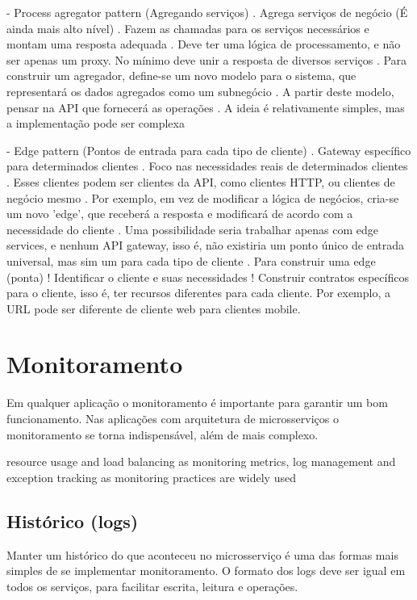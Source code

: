 - Process agregator pattern (Agregando serviços)
    . Agrega serviços de negócio (É ainda mais alto nível)
    . Fazem as chamadas para os serviços necessários e montam uma resposta adequada
    . Deve ter uma lógica de processamento, e não ser apenas um proxy. No mínimo deve unir a resposta de diversos serviços
    . Para construir um agregador, define-se um novo modelo para o sistema, que representará os dados agregados como um subnegócio
    . A partir deste modelo, pensar na API que fornecerá as operações
    . A ideia é relativamente simples, mas a implementação pode ser complexa

- Edge pattern (Pontos de entrada para cada tipo de cliente)
    . Gateway específico para determinados clientes
    . Foco nas necessidades reais de determinados clientes
    . Esses clientes podem ser clientes da API, como clientes HTTP, ou clientes de negócio mesmo
    . Por exemplo, em vez de modificar a lógica de negócios, cria-se um novo 'edge', que receberá a resposta e modificará de acordo com a necessidade do cliente
    . Uma possibilidade seria trabalhar apenas com edge services, e nenhum API gateway, isso é, não existiria um ponto único de entrada universal, mas sim um para cada tipo de cliente
    . Para construir uma edge (ponta)
        ! Identificar o cliente e suas necessidades
        ! Construir contratos específicos para o cliente, isso é, ter recursos diferentes para cada cliente. Por exemplo, a URL pode ser diferente de cliente web para clientes mobile.

\section{Monitoramento}

Em qualquer aplicação o monitoramento é importante para garantir um bom funcionamento. Nas aplicações com arquitetura de microsserviços o monitoramento se torna indispensável, além de mais complexo. %

resource usage and load balancing as monitoring metrics, log management and exception tracking as monitoring practices are widely used \cite{design-monitoring-testing-waseem}

\subsection{Histórico (logs)}

Manter um histórico do que aconteceu no microsserviço é uma das formas mais simples de se implementar monitoramento. O formato dos logs deve ser igual em todos os serviços, para facilitar escrita, leitura e operações.

